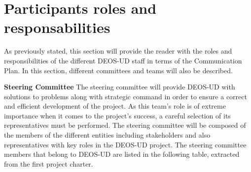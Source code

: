 \section{Participants roles and responsabilities}
As previously stated, this section will provide the reader with the roles and responsibilities of the different DEOS-UD staff in terms of the Communication Plan. In this section, different committees and teams will also be described. 

\textbf{Steering Committee}
\newline
\newline
The steering committee will provide DEOS-UD with solutions to problems along with strategic command in order to ensure a correct and efficient development of the project. As this team’s role is of extreme importance when it comes to the project’s success, a careful selection of its representatives must be performed. The steering committee will be composed of the members of the different entities including stakeholders and also representatives with key roles in the DEOS-UD project. The steering committee members that belong to DEOS-UD  are listed in the following table, extracted from the first project charter. 

